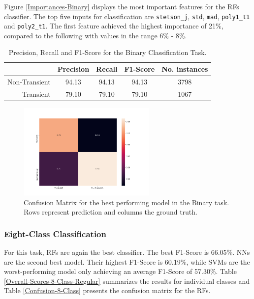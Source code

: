 \documentclass{aastex62}
\begin{document}
Figure \ref{Importances-Binary} displays the most important features
for the RFs classifier.
The top five inputs for classification are \texttt{stetson\_j},
\texttt{std}, \texttt{mad}, \texttt{poly1\_t1} and \texttt{poly2\_t1}.  
The first feature achieved the highest importance of 21\%, compared to
the following with values in the range 6\% - 8\%.  


\begin{table}
\centering
\begin{tabular}{|r|c|c|c|c|}
\hline
\multicolumn{1}{|l|}{} & Precision & Recall & F1-Score & No. instances \\ \hline \hline
Non-Transient          & 94.13     & 94.13      & 94.13      & 3798   \\ \hline
Transient              & 79.10     & 79.10      & 79.10      & 1067    \\ \hline
\end{tabular}
\caption{Precision, Recall and F1-Score for the Binary Classification Task.}
\label{Overall-Scores-Binary}
\end{table}


\begin{figure}
\begin{center}
	\includegraphics[width=0.6\textwidth]{normalizedCMBinary.png}
\end{center}
  \caption{Confusion Matrix for the best performing model in the Binary task. Rows represent prediction and columns the ground truth.}
  \label{fig:normalizedBinaryCM}
\end{figure} 





\subsubsection{Eight-Class Classification}

For this task, RFs are again the best classifier.  
The best F1-Score is 66.05\%. 
NNs are the second best model. 
Their highest F1-Score is 60.19\%, while SVMs are the worst-performing
model only achieving an average F1-Score of 57.30\%.
Table \ref{Overall-Scores-8-Class-Regular} summarizes the results for 
individual classes and Table \ref{Confusion-8-Class} presents 
the confusion matrix for the RFs.
\end{document}
